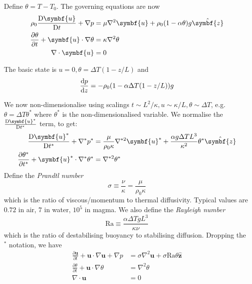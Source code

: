 \documentclass{jknotes}
\renewcommand{\u}{\symbf{u}}
\begin{document}
Define $\theta = T - T_0$. The governing equations are now
\begin{align}
	\rho_0 \frac{\diffD \u}{\diffD t} + \nabla p &= \mu \nabla^2 \u +
	\rho_0(1-\alpha \theta)g \hat{\symbf{z}} \\
	\frac{\partial \theta}{\partial t} + \u \cdot \nabla \theta &= \kappa
	\nabla^2 \theta \\
	\nabla \cdot \u &= 0
\end{align}

The basic state is $u = 0, \theta = \Delta T (1-z/L)$ and
\begin{equation}
	\frac{\diffd p}{\diffd z} = -\rho_0 (1-\alpha \Delta T(1-z/L))g
\end{equation}

We now non-dimensionalise using scalings $t \sim L^2/\kappa, u \sim \kappa/L,
\theta \sim \Delta T$, e.g. $\theta = \Delta T \theta^*$ where $\theta^*$ is
the non-dimensionalised variable. We normalise the $\frac{\diffD \u^*}{\diffD
t^*}$ term, to get:
\begin{align}
	\frac{\diffD \u^*}{\diffD t^*} + \nabla^* p^* &= \frac{\mu}{\rho_0 \kappa}
	\nabla^{*2} \u^* + \frac{\alpha g \Delta T L^3}{\kappa^2} \theta^* \hat{\symbf{z}} \\
	\frac{\partial \theta^*}{\partial t^*} + \u^* \cdot \nabla^* \theta^* &=
	\nabla^{*2} \theta^* \\
\end{align}
Define the \emph{Prandtl number} 
\begin{equation}
	\sigma \equiv \frac{\nu}{\kappa} = \frac{\mu}{\rho_0 \kappa}
\end{equation}
which is the ratio of viscous/momentum to thermal diffusivity. Typical values
are $0.72$ in air, $7$ in water, $10^5$ in magma. We also define the
\emph{Rayleigh number}
\begin{equation}
	\text{Ra} \equiv \frac{\alpha \Delta T g L^3}{\kappa \nu}
\end{equation}
which is the ratio of destabilising buoyancy to stabilising diffusion.
Dropping the $^*$ notation, we have
\begin{align}
	\frac{\partial \u}{\partial t} + \u \cdot \nabla \u + \nabla p &= \sigma
	\nabla^2 \u + \sigma \text{Ra} \theta \hat{\symbf{z}} \\
	\frac{\partial \theta}{\partial t} + \u \cdot \nabla \theta &= \nabla^2
	\theta \\
	\nabla \cdot \u &= 0
\end{align}
\end{document}
